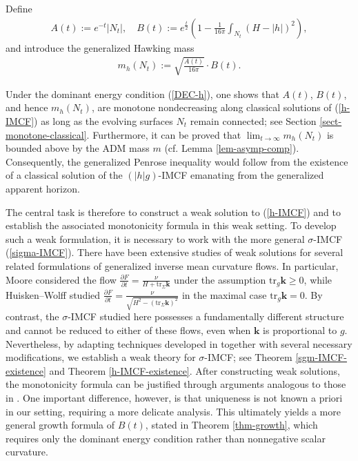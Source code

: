 \documentclass[11pt, letterpaper]{amsart}
\theoremstyle{definition}
\theoremstyle{remark}
\begin{document}
Define 
\begin{align}\label{defn-A-B}
	 A(t):= e ^{-t}|N_t|, \quad B(t):= e ^{\frac{t}{2}} \left( 1- \frac{1}{16 \pi } \int_{N_t}(H- |h|)^2 \right),
\end{align}
and introduce the generalized Hawking mass
\begin{align}\label{defn-H-mass0}
	m_h(N_t) := \sqrt{\frac{A(t)}{16 \pi }} \cdot B(t).
\end{align}

Under the dominant energy condition (\ref{DEC-h}), one shows that  $A(t)$, $B(t)$, and hence $m_h(N_t)$, are monotone nondecreasing along classical solutions of (\ref{h-IMCF}) as long as the evolving surfaces $N_t$ remain connected; see Section \ref{sect-monotone-classical}. Furthermore, it can be proved that $\lim_{t\to \infty}  m_h(N_t) $ is bounded above by the ADM mass $m$ (cf. Lemma \ref{lem-asymp-comp}). Consequently, the generalized Penrose inequality would follow from the existence of a classical solution of the $(|h|g)$-IMCF emanating from the generalized apparent horizon.

The central task is therefore to construct a weak solution to (\ref{h-IMCF}) and to establish the associated monotonicity formula in this weak setting. To develop such a weak formulation, it is necessary to work with the more general $\sigma $-IMCF (\ref{sigma-IMCF}). There have been extensive studies of weak solutions for several related formulations of generalized inverse mean curvature flows. In particular, Moore \cite{Moore12} considered the flow $\frac{\partial F}{\partial t} = \frac{\nu }{H + \mathrm{tr}_{\Sigma } \mathbf{k}}$ under the assumption $\mathrm{tr}_g \mathbf{k} \geq 0$, while Huisken–Wolff \cite{HuiskenWolff22} studied $\frac{\partial F}{\partial t} = \frac{\nu }{\sqrt{H^2 - (\mathrm{tr}_{\Sigma }\mathbf{k})^2} }$ in the maximal case $\mathrm{tr}_{g} \mathbf{k} =0$. By contrast, the $\sigma $-IMCF studied here possesses a fundamentally different structure and cannot be reduced to either of these flows, even when $\mathbf{k}$ is proportional to $g$. Nevertheless, by adapting techniques developed in \cite{HI01, Moore12, HuiskenWolff22} together with several necessary modifications, we establish a weak theory for $\sigma $-IMCF; see Theorem \ref{sgm-IMCF-existence} and Theorem \ref{h-IMCF-existence}. After constructing weak solutions, the monotonicity formula can be justified through arguments analogous to those in \cite{HI01}. One important difference, however, is that uniqueness is not known a priori in our setting, requiring a more delicate analysis. This ultimately yields a more general growth formula of $B(t)$, stated in Theorem \ref{thm-growth}, which requires only the dominant energy condition rather than nonnegative scalar curvature.
\end{document}
